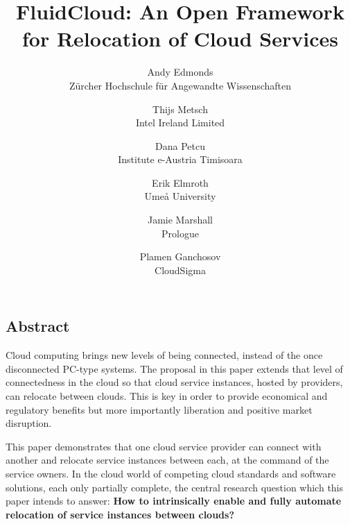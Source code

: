 \documentclass[letterpaper,twocolumn,10pt]{article}
\begin{document}
\date{}

\title{\Large \bf FluidCloud: An Open Framework for Relocation of Cloud Services}

\author{
{\rm Andy Edmonds}\\
Z\"urcher Hochschule f\"ur Angewandte Wissenschaften
\and
{\rm Thijs Metsch}\\
Intel Ireland Limited
\and
{\rm Dana Petcu}\\
Institute e-Austria Timisoara
\and
{\rm Erik Elmroth}\\
Ume{\aa} University
\and
{\rm Jamie Marshall}\\
Prologue
\and
{\rm Plamen Ganchosov}\\
CloudSigma
}

\maketitle


\subsection*{Abstract}

Cloud computing brings new levels of being connected, instead of the once disconnected 
PC-type systems. The proposal in this paper extends that level of connectedness in the cloud so that 
cloud service instances, hosted by providers, can relocate between clouds. This is key in order to 
provide economical and regulatory benefits but more importantly liberation and positive market disruption.

This paper demonstrates that one cloud service provider can connect with another and 
relocate service instances between each, at the command of the service owners. In the cloud world of 
competing cloud standards and software solutions, each only partially complete, the central research 
question which this paper intends to answer:
\noindent
\textbf{How to intrinsically enable and fully automate relocation of service instances between clouds?}
\end{document}
